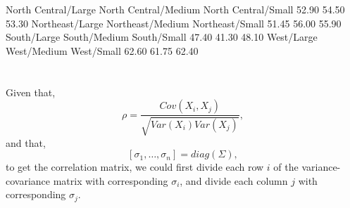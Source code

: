 \documentclass{article}
\newenvironment{Houtput}{\raggedright}{%
%
}
\begin{document}
\begin{enumerate}[(a)]
\begin{Houtput}
\begin{Schunk}
\begin{Soutput}
 North Central/Large North Central/Medium  North Central/Small 
               52.90                54.50                53.30 
     Northeast/Large     Northeast/Medium      Northeast/Small 
               51.45                56.00                55.90 
         South/Large         South/Medium          South/Small 
               47.40                41.30                48.10 
          West/Large          West/Medium           West/Small 
               62.60                61.75                62.40 
\end{Soutput}

\end{Schunk}
\end{Houtput}
    \end{enumerate}
    \section{}
    Given that,
    \[
    \rho = \frac{Cov(X_i, X_j)}{\sqrt{Var(X_i)Var(X_j)}},
    \]
    and that,
    \[
    [\sigma_1, \dots, \sigma_n] = diag(\Sigma),
    \]
    to get the correlation matrix, we could first divide each row $i$ of the variance-covariance matrix with
    corresponding $\sigma_i$, and divide each column $j$ with corresponding $\sigma_j$.
\end{document}
